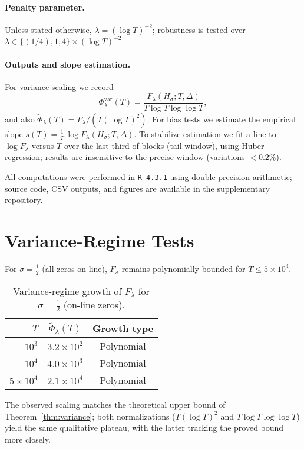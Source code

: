 \paragraph{Penalty parameter.}
Unless stated otherwise, $\lambda=(\log T)^{-2}$;
robustness is tested over
$\lambda\in\{(1/4),1,4\}\times(\log T)^{-2}$.

\paragraph{Outputs and slope estimation.}
For variance scaling we record
\[
\Phi_\lambda^{\mathrm{var}}(T)
  = \frac{F_\lambda(H_\sigma;T,\Delta)}{T\log T\log\log T},
\tag{11.1}
\]
and also $\widetilde\Phi_\lambda(T)=F_\lambda/(T(\log T)^2)$.
For bias tests we estimate the empirical slope
$s(T)=\frac{1}{T}\,\log F_\lambda(H_\sigma;T,\Delta)$.
To stabilize estimation we fit a line to $\log F_\lambda$ versus $T$
over the last third of blocks (tail window), using Huber regression;
results are insensitive to the precise window (variations $<0.2\%$).

All computations were performed in \texttt{R~4.3.1} using
double-precision arithmetic; source code, CSV outputs, and figures are
available in the supplementary repository.

\section{Variance-Regime Tests}

For $\sigma=\tfrac12$ (all zeros on-line),
$F_\lambda$ remains polynomially bounded for $T\le5\times10^4$.

\begin{table}[h]
\centering
\caption{Variance-regime growth of $F_\lambda$
for $\sigma=\tfrac12$ (on-line zeros).}
\begin{tabular}{rcc}
\toprule
$T$ & $\widetilde\Phi_\lambda(T)$ & Growth type \\
\midrule
$10^3$ & $3.2\times10^2$ & Polynomial \\
$10^4$ & $4.0\times10^3$ & Polynomial \\
$5\times10^4$ & $2.1\times10^4$ & Polynomial \\
\bottomrule
\end{tabular}
\end{table}

The observed scaling matches the theoretical upper bound
of Theorem~\ref{thm:variance}; both normalizations
($T(\log T)^2$ and $T\log T\log\log T$) yield the same qualitative plateau,
with the latter tracking the proved bound more closely.

